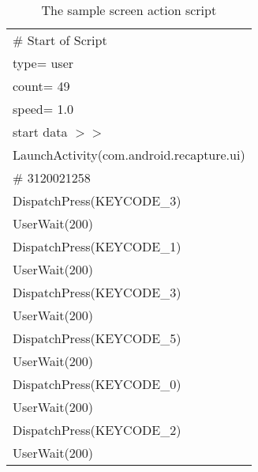 \begin{table}
\centering
\caption{The sample screen action script}
\begin{tabular}{|l|}\hline
\# Start of Script \\
type= user\\
count= 49\\
speed= 1.0\\
start data $>>$\\
LaunchActivity(com.android.recapture.ui)\\
\# 3120021258\\
DispatchPress(KEYCODE\_3)\\
UserWait(200)\\
DispatchPress(KEYCODE\_1)\\
UserWait(200)\\
DispatchPress(KEYCODE\_3)\\
UserWait(200)\\
DispatchPress(KEYCODE\_5)\\
UserWait(200)\\
DispatchPress(KEYCODE\_0)\\
UserWait(200)\\
DispatchPress(KEYCODE\_2)\\
UserWait(200)\\\hline
\end{tabular}
\label{tab:script}
\end{table}
